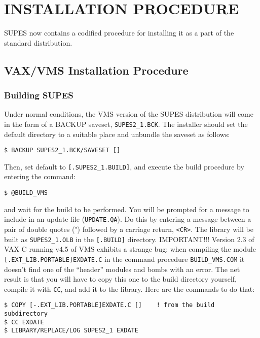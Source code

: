 \chapter{INSTALLATION PROCEDURE} \label{sec:install}
SUPES now contains a codified procedure
for installing it as a part of the standard distribution.

\section{VAX/VMS Installation Procedure}

\subsection{Building SUPES}

Under normal conditions,
the VMS version of the SUPES distribution will come
in the form of a BACKUP saveset,
\verb+SUPES2_1.BCK+.
The installer should set the default directory
to a suitable place and unbundle the saveset as follows:
\begin{verbatim}
$ BACKUP SUPES2_1.BCK/SAVESET []
\end{verbatim}
Then,
set default to \verb+[.SUPES2_1.BUILD]+, and execute the build procedure
by entering the command:
\begin{verbatim}
$ @BUILD_VMS
\end{verbatim}
and wait for the build to be performed.
You will be prompted
for a message to include in an update file (\verb+UPDATE.QA+).
Do this by entering a message between a pair of double quotes (")
followed by a carriage return, \verb+<CR>+.
The library will be built as \verb+SUPES2_1.OLB+
in the \verb+[.BUILD]+ directory.
IMPORTANT!!!
Version 2.3
of VAX C running v4.5 of VMS exhibits a
strange bug:
when compiling the module \verb+[.EXT_LIB.PORTABLE]EXDATE.C+
in the command procedure \verb+BUILD_VMS.COM+ it doesn't find
one of the ``header'' modules and bombs with an error.
The net result is that you will have to copy this one to
the build directory yourself, compile it with \verb+CC+,
and add it to the library.  Here are the commands to do that:
\begin{verbatim}
$ COPY [-.EXT_LIB.PORTABLE]EXDATE.C []    ! from the build subdirectory
$ CC EXDATE
$ LIBRARY/REPLACE/LOG SUPES2_1 EXDATE
\end{verbatim}

